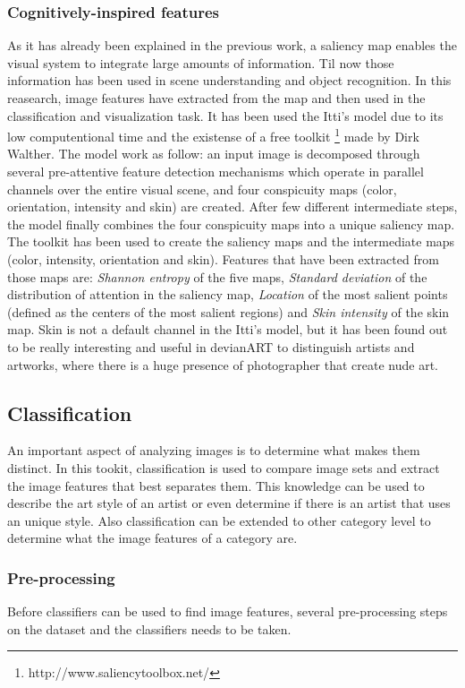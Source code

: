 \subsubsection{Cognitively-inspired features}
As it has already been explained in the previous work, a saliency map enables the visual system to integrate large amounts of information. Til now those information has been used in scene understanding and object recognition. In this reasearch, image features have extracted from the map and then used in the classification and visualization task.  
It has been used the Itti's model \cite{Itti_model} due to its low computentional time and the existense of a free toolkit \footnote{http://www.saliencytoolbox.net/} made by Dirk Walther.
The model work as follow: an input image is decomposed through several pre-attentive feature detection mechanisms which operate in parallel channels over the entire visual scene, and four conspicuity maps (color, orientation, intensity and skin) are created. After few different intermediate steps, the model finally combines the four conspicuity maps into a unique saliency map. 
The toolkit has been used to create the saliency maps and the intermediate maps (color, intensity, orientation and skin). Features that have been extracted from those maps are: \textit{Shannon entropy} of the five maps, \textit{Standard deviation} of the distribution of attention in the saliency map, \textit{Location} of the most salient points (defined as the centers of the most salient regions) and \textit{Skin intensity} of the skin map. Skin is not a default channel in the Itti's model, but it has been found out to be really interesting and useful in devianART to distinguish artists and artworks, where there is a huge presence of photographer that create nude art. 

\subsection{Classification}
An important aspect of analyzing images is to determine what makes them distinct.
In this tookit, classification is used to compare image sets and extract the image features that best separates them.
This knowledge can be used to describe the art style of an artist or even determine if there is an artist that uses an unique style.
Also classification can be extended to other category level to determine what the image features of a category are.

\subsubsection{Pre-processing}
Before classifiers can be used to find image features, several pre-processing steps on the dataset and the classifiers needs to be taken.


